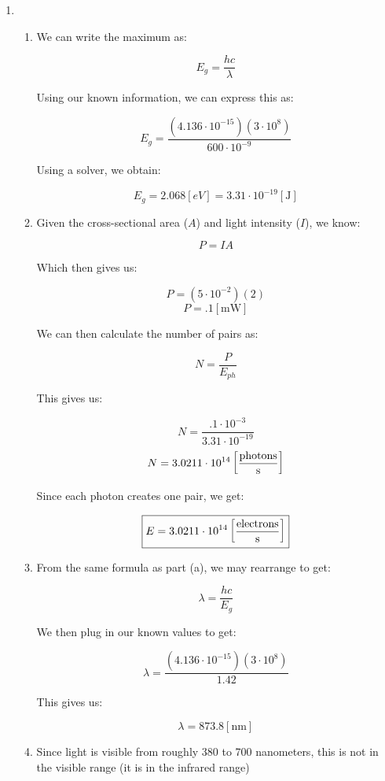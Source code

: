 \begin{enumerate}

  \item

    \begin{enumerate}

      \item We can write the maximum as:

        $$E_g=\frac{hc}{\lambda}$$

        Using our known information, we can express this as:

        $$E_g=\frac{(4.136\cdot10^{-15})(3\cdot10^{8})}{600\cdot10^{-9}}$$

        Using a solver, we obtain:

        $$\boxed{E_g=2.068[\si{eV}]=3.31\cdot10^{-19}[\si{\joule}]}$$

      \item Given the cross-sectional area ($A$) and light intensity ($I$), we know:

        $$P=IA$$

        Which then gives us:

        $$P=(5\cdot10^{-2})(2)$$
        $$\boxed{P=.1[\si{\milli\watt}]}$$

        We can then calculate the number of pairs as:

        $$N=\frac{P}{E_{ph}}$$

        This gives us:

        $$N=\frac{.1\cdot10^{-3}}{3.31\cdot10^{-19}}$$
        $$N=3.0211\cdot10^{14}\left[\si{photons\over\second}\right]$$

        Since each photon creates one pair, we get:

        $$\boxed{E=3.0211\cdot10^{14}\left[\si{electrons\over\second}\right]}$$

      \item From the same formula as part (a), we may rearrange to get:

        $$\lambda=\frac{hc}{E_g}$$

        We then plug in our known values to get:

        $$\lambda=\frac{(4.136\cdot10^{-15})(3\cdot10^{8})}{1.42}$$

        This gives us:

        $$\boxed{\lambda=873.8[\si{\nano\meter}]}$$

      \item Since light is visible from roughly 380 to 700 nanometers, this is not in the visible range (it is in the infrared range)


\end{enumerate}
\end{enumerate}
